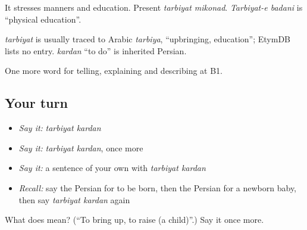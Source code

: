 It stresses manners and education. Present \emph{tarbiyat mikonad}. \emph{Tarbiyat-e badani} is \textquotedblleft{}physical education\textquotedblright{}.

\begin{cousinweb}
\emph{tarbiyat} is usually traced to Arabic \emph{tarbiya}, \textquotedblleft{}upbringing, education\textquotedblright{}; EtymDB lists no entry. \emph{kardan} \textquotedblleft{}to do\textquotedblright{} is inherited Persian.
\end{cousinweb}

\begin{grammarlens}[title={What you've built}]
One more word for telling, explaining and describing at B1.
\end{grammarlens}

\subsection*{Your turn}
\begin{itemize}
\raggedright
  \item \emph{Say it:} \emph{tarbiyat kardan}
  \item \emph{Say it:} \emph{tarbiyat kardan}, once more
  \item \emph{Say it:} a sentence of your own with \emph{tarbiyat kardan}
  \item \emph{Recall:} say the Persian for to be born, then the Persian for a newborn baby, then say \emph{tarbiyat kardan} again
\end{itemize}

\begin{tcolorbox}[breakable,colback=teal!4,colframe=teal!35!black,title={Before you move on}]
What does   mean? (\textquotedblleft{}To bring up, to raise (a child)\textquotedblright{}.) Say it once more.
\end{tcolorbox}
